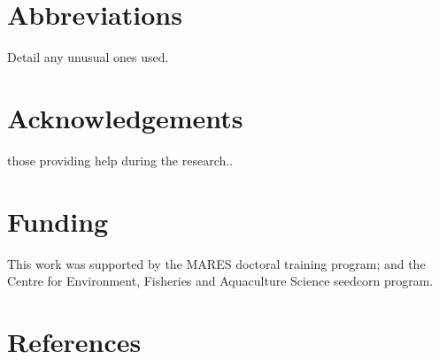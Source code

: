\documentclass[review]{elsarticle}
\begin{document}
\newpage

\section*{Abbreviations} Detail any unusual ones used.

\section*{Acknowledgements} those providing help during the research..

\section*{Funding} This work was supported by the MARES doctoral training
program; and the Centre for Environment, Fisheries and Aquaculture Science
seedcorn program.

\section*{References}


\end{document}
